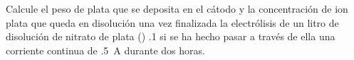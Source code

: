 Calcule el peso de plata que se deposita en el cátodo y la concentración de ion plata que queda en disolución una vez finalizada la electrólisis de un litro de disolución de nitrato de plata () \SI{,1}{\Molar} si se ha hecho pasar a través de ella una corriente continua de \SI{,5}{\ampere} durante dos horas.
